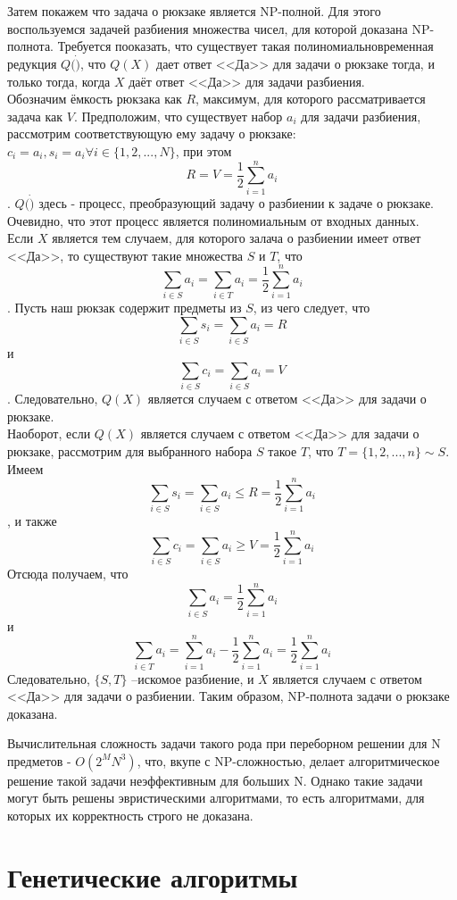 Затем покажем что задача о рюкзаке является NP-полной. Для этого воспользуемся задачей разбиения множества чисел, для которой доказана NP-полнота. 
Требуется пооказать, что существует такая полиномиальновременная редукция $Q(\dot)$, что $Q(X)$ дает ответ <<Да>> для задачи о рюкзаке тогда, и только тогда, когда $X$ даёт ответ <<Да>> для задачи разбиения.\\
Обозначим ёмкость рюкзака как $R$, максимум, для которого рассматривается задача как $V$. 
Предположим, что существует набор $a_i$ для задачи разбиения, рассмотрим соответствующую ему задачу о рюкзаке:$c_i=a_i, s_i=a_i \forall i\in\{1,2,...,N\}$, при этом \[R=V=\frac{1}{2}\sum_{i=1}^{n}a_i\]. $Q(\dot)$ здесь - процесс, преобразующий задачу о разбиении к задаче о рюкзаке. Очевидно, что этот процесс является полиномиальным от входных данных.\\
Если $X$ является тем случаем, для которого залача о разбиении имеет ответ  <<Да>>, то существуют такие множества $S$ и $T$, что
\[\sum_{i\in S}a_i=\sum_{i\in T}a_i=\frac{1}{2}\sum_{i=1}^{n}a_i\].
Пусть наш рюкзак содержит предметы из $S$, из чего следует, что \[\sum_{i\in S}s_i=\sum_{i\in S}a_i=R\] и \[\sum_{i\in S}c_i=\sum_{i\in S}a_i=V\]. Следовательно, $Q(X)$ является случаем с ответом <<Да>> для задачи о рюкзаке.\\
Наоборот, если $Q(X)$ является случаем с ответом <<Да>> для задачи о рюкзаке, рассмотрим для выбранного набора $S$ такое $T$, что $T=\{1,2,...,n\}\sim S$. 
Имеем \[\sum_{i\in S}s_i=\sum_{i\in S}a_i\leq R=\frac{1}{2}\sum_{i=1}^{n}a_i\], 
и также \[\sum_{i\in S}c_i=\sum_{i\in S}a_i\geq V=\frac{1}{2}\sum_{i=1}^{n}a_i\]
Отсюда получаем, что \[\sum_{i\in S}a_i=\frac{1}{2}\sum_{i=1}^{n}a_i\] 
и \[\sum_{i\in T}a_i=\sum_{i=1}^{n}a_i-\frac{1}{2}\sum_{i=1}^{n}a_i=\frac{1}{2}\sum_{i=1}^{n}a_i\]
Следовательно, $\{S,T\}$ --искомое разбиение, и $X$ является случаем с ответом <<Да>> для задачи о разбиении. Таким образом, NP-полнота задачи о рюкзаке доказана.


Вычислительная сложность задачи такого рода при переборном решении для N предметов - $ O(2^MN^3) $, что, вкупе с NP-сложностью, делает алгоритмическое решение такой задачи неэффективным для больших N.
Однако такие задачи могут быть решены эвристическими алгоритмами, то есть алгоритмами, для которых их корректность строго не доказана. 

\section{Генетические алгоритмы}

